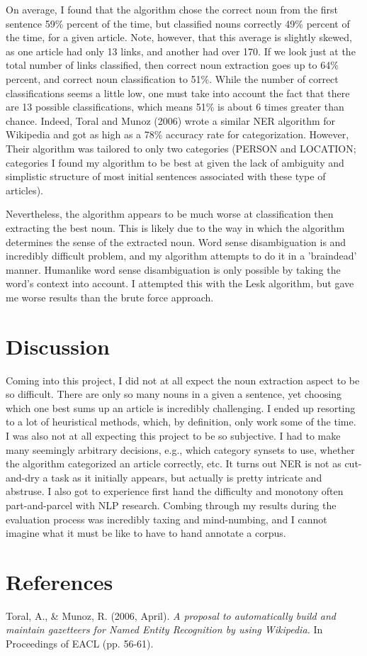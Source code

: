 \documentclass[12pt]{article}
\begin{document}
On average, I found that the algorithm chose the correct noun from the first sentence 59\% percent of the time, but classified nouns correctly 49\% percent of the time, for a given article. Note, however, that this average is slightly skewed, as one article had only 13 links, and another had over 170. If we look just at the total number of links classified, then correct noun extraction goes up to 64\% percent, and correct noun classification to 51\%. While the number of correct classifications seems a little low, one must take into account the fact that there are 13 possible classifications, which means 51\% is about 6 times greater than chance. Indeed, Toral and Munoz (2006) wrote a similar NER algorithm for Wikipedia and got as high as a 78\% accuracy rate for categorization. However, Their algorithm was tailored to only two categories (PERSON and LOCATION; categories I found my algorithm to be best at given the lack of ambiguity and simplistic structure of most initial sentences associated with these type of articles).

Nevertheless, the algorithm appears to be much worse at classification then extracting the best noun. This is likely due to the way in which the algorithm determines the sense of the extracted noun. Word sense disambiguation is and incredibly difficult problem, and my algorithm attempts to do it in a 'braindead' manner. Humanlike word sense disambiguation is only possible by taking the word's context into account. I attempted this with the Lesk algorithm, but gave me worse results than the brute force approach.

\section{Discussion}
\label{sec:orgheadline6}

Coming into this project, I did not at all expect the noun extraction aspect to be so difficult. There are only so many nouns in a given a sentence, yet choosing which one best sums up an article is incredibly challenging. I ended up resorting to a lot of heuristical methods, which, by definition, only work some of the time. I was also not at all expecting this project to be so subjective. I had to make many seemingly arbitrary decisions, e.g., which category synsets to use, whether the algorithm categorized an article correctly, etc. It turns out NER is not as cut-and-dry a task as it initially appears, but actually is pretty intricate and abstruse. I also got to experience first hand the difficulty and monotony often part-and-parcel with NLP research. Combing through my results during the evaluation process was incredibly taxing and mind-numbing, and I cannot imagine what it must be like to have to hand annotate a corpus. 


\section{References}
\label{sec:orgheadline7}

Toral, A., \& Munoz, R. (2006, April). \emph{A proposal to automatically build and maintain gazetteers for Named Entity Recognition by using Wikipedia.} In Proceedings of EACL (pp. 56-61).
\end{document}
